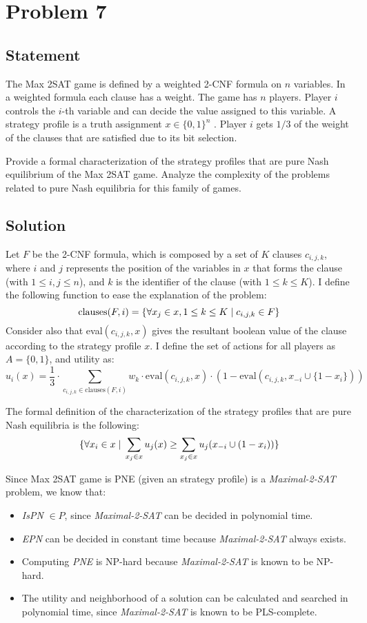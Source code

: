 \documentclass[a4paper, 11pt]{article}
\newcommand{\onemm}[0]{\hspace{1mm}}
\newcommand{\suchthat}[0]{\onemm|\onemm}
\begin{document}
\section*{Problem 7}
{\color{statement}
\subsection*{Statement}
The Max 2SAT game is defined by a weighted 2-CNF formula on $n$ variables. In a weighted formula each clause has a weight. The game has $n$ players. Player $i$ controls the $i$-th variable and can decide the value assigned to this variable. A strategy profile is a truth assignment $x \in \{0, 1\}^n$ . Player $i$ gets $1/3$ of the weight of the clauses that are satisfied due to its bit selection.

Provide a formal characterization of the strategy profiles that are pure Nash equilibrium of the Max 2SAT game. Analyze the complexity of the problems related to pure Nash equilibria for this family of games.}

\subsection*{Solution}
Let $F$ be the 2-CNF formula, which is composed by a set of $K$ clauses $c_{i,j,k}$, where $i$ and $j$ represents the position of the variables in $x$ that forms the clause (with $1 \leq i,j \leq n$), and $k$ is the identifier of the clause (with $1 \leq k \leq K$). I define the following function to ease the explanation of the problem:
\[\text{clauses}(F,i) = \{\forall x_j \in x,  1 \leq k \leq K \suchthat c_{i,j,k} \in F\}\]
Consider also that eval$(c_{i,j,k},x)$ gives the resultant boolean value of the clause according to the strategy profile $x$. I define the set of actions for all players as $A = \{0,1\}$, and utility as:
\[
    u_i(x) = \frac{1}{3}\cdot\sum_{c_{i,j,k} \in \text{clauses}(F,i)} w_k\cdot \text{eval}(c_{i,j,k},x) \cdot (1-\text{eval}(c_{i,j,k},x_{-i}\cup \{1-x_i\}))
\]

The formal definition of the characterization of the strategy profiles that are pure Nash equilibria is the following:
\[
    \{\forall x_i \in x \suchthat \sum_{x_j\in x}u_j(x)\geq \sum_{x_j\in x}u_j(x_{-i}\cup (1-x_i)) \}
\]

Since Max 2SAT game is PNE (given an strategy profile) is a \textit{Maximal-2-SAT} problem, we know that:
\begin{itemize}
    \item \textit{IsPN} $\in P$, since \textit{Maximal-2-SAT} can be decided in polynomial time.
    \item \textit{EPN} can be decided in constant time because \textit{Maximal-2-SAT} always exists.
    \item Computing \textit{PNE} is NP-hard because \textit{Maximal-2-SAT} is known to be NP-hard.
    \item The utility and neighborhood of a solution can be calculated and searched in polynomial time, since \textit{Maximal-2-SAT} is known to be PLS-complete.
\end{itemize}
\newpage
\end{document}
